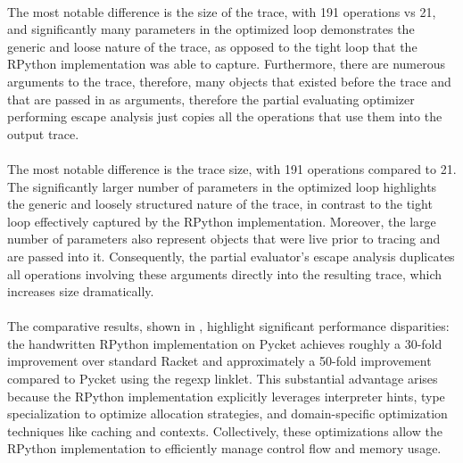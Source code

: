 			\paragraph{}%
				The most notable difference is the size of the trace, with 191 operations vs 21, and significantly many parameters in the optimized loop demonstrates the generic and loose nature of the trace, as opposed to the tight loop that the RPython implementation was able to capture. Furthermore, there are numerous arguments to the trace, therefore, many objects that existed before the trace and that are passed in as arguments, therefore the partial evaluating optimizer performing escape analysis just copies all the operations that use them into the output trace.

			\paragraph{}%
				The most notable difference is the trace size, with 191 operations compared to 21. The significantly larger number of parameters in the optimized loop highlights the generic and loosely structured nature of the trace, in contrast to the tight loop effectively captured by the RPython implementation. Moreover, the large number of parameters also represent objects that were live prior to tracing and are passed into it. Consequently, the partial evaluator’s escape analysis duplicates all operations involving these arguments directly into the resulting trace, which increases size dramatically.


			\paragraph{}%
				The comparative results, shown in , highlight significant performance disparities: the handwritten RPython implementation on Pycket achieves roughly a 30-fold improvement over standard Racket and approximately a 50-fold improvement compared to Pycket using the regexp linklet. This substantial advantage arises because the RPython implementation explicitly leverages interpreter hints, type specialization to optimize allocation strategies, and domain-specific optimization techniques like caching and contexts. Collectively, these optimizations allow the RPython implementation to efficiently manage control flow and memory usage.


